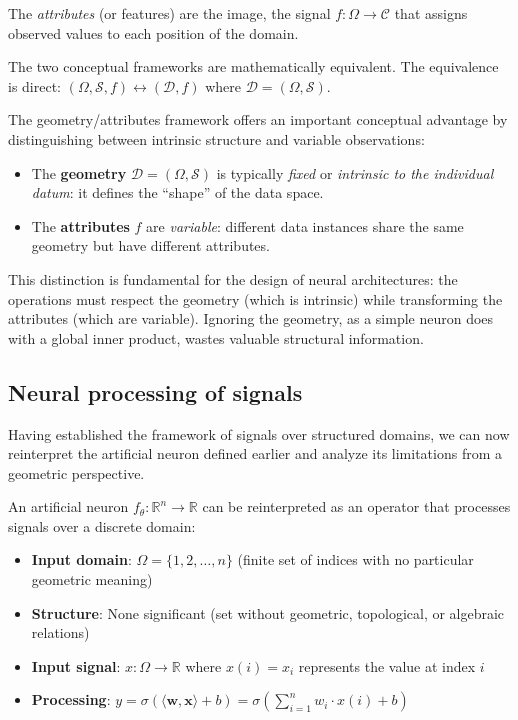 \begin{definition}[Attributes]\label{def:atributos}
The \textit{attributes} (or features) are the image, the signal $f: \Omega \to \mathcal{C}$ that assigns observed values to each position of the domain.
\end{definition}

The two conceptual frameworks are mathematically equivalent\label{rem:equivalencia_marcos}. The equivalence is direct: $(\Omega, \mathcal{S}, f) \leftrightarrow (\mathcal{D}, f)$ where $\mathcal{D} = (\Omega, \mathcal{S})$.

The geometry/attributes framework offers an important conceptual advantage by distinguishing between intrinsic structure and variable observations:

\begin{itemize}
	\item The \textbf{geometry} $\mathcal{D} = (\Omega, \mathcal{S})$ is typically \textit{fixed} or \textit{intrinsic to the individual datum}: it defines the ``shape'' of the data space.

	\item The \textbf{attributes} $f$ are \textit{variable}: different data instances share the same geometry but have different attributes.
\end{itemize}

This distinction is fundamental for the design of neural architectures: the operations must respect the geometry (which is intrinsic) while transforming the attributes (which are variable). Ignoring the geometry, as a simple neuron does with a global inner product, wastes valuable structural information.

\subsection{Neural processing of signals}\label{sec:neurona_senales}

Having established the framework of signals over structured domains, we can now reinterpret the artificial neuron defined earlier and analyze its limitations from a geometric perspective.

An artificial neuron $f_\theta: \mathbb{R}^n \to \mathbb{R}$ can be reinterpreted as an operator that processes signals over a discrete domain:

\begin{itemize}
	\item \textbf{Input domain}: $\Omega = \{1, 2, \ldots, n\}$ (finite set of indices with no particular geometric meaning)
	\item \textbf{Structure}: None significant (set without geometric, topological, or algebraic relations)
	\item \textbf{Input signal}: $x: \Omega \to \mathbb{R}$ where $x(i) = x_i$ represents the value at index $i$
	\item \textbf{Processing}: $y = \sigma(\langle \mathbf{w}, \mathbf{x} \rangle + b) = \sigma\left(\sum_{i=1}^n w_i \cdot x(i) + b\right)$
\end{itemize}

